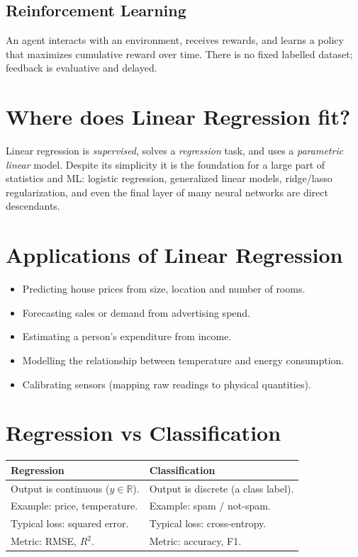 \documentclass[11pt,a4paper]{report}
\theoremstyle{definition}
\theoremstyle{plain}
\theoremstyle{remark}
\newcommand{\R}{\mathbb{R}}
\begin{document}
	\subsection{Reinforcement Learning}
	An agent interacts with an environment, receives rewards, and learns a policy
	that maximizes cumulative reward over time. There is no fixed labelled dataset;
	feedback is evaluative and delayed.
	
	\section{Where does Linear Regression fit?}
	Linear regression is \emph{supervised}, solves a \emph{regression} task, and
	uses a \emph{parametric linear} model. Despite its simplicity it is the
	foundation for a large part of statistics and ML: logistic regression,
	generalized linear models, ridge/lasso regularization, and even the final
	layer of many neural networks are direct descendants.
	
	\section{Applications of Linear Regression}
	\begin{itemize}[nosep]
		\item Predicting house prices from size, location and number of rooms.
		\item Forecasting sales or demand from advertising spend.
		\item Estimating a person's expenditure from income.
		\item Modelling the relationship between temperature and energy consumption.
		\item Calibrating sensors (mapping raw readings to physical quantities).
	\end{itemize}
	
	\section{Regression vs Classification}
	\begin{center}
		\begin{tabular}{@{}p{6.5cm}p{6.5cm}@{}}
			\toprule
			\textbf{Regression} & \textbf{Classification}\\
			\midrule
			Output is continuous ($y\in\R$).      & Output is discrete (a class label).\\
			Example: price, temperature.          & Example: spam / not-spam.\\
			Typical loss: squared error.          & Typical loss: cross-entropy.\\
			Metric: RMSE, $R^2$.                  & Metric: accuracy, F1.\\
			\bottomrule
		\end{tabular}
	\end{center}
	
\end{document}
